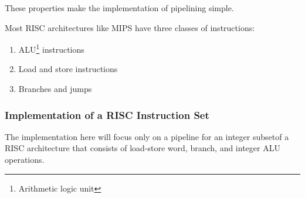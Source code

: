 \documentclass[12pt, a4paper]{article}
\theoremstyle{margin}
\begin{document}
      These properties make the implementation of pipelining simple.

      Most RISC architectures like MIPS have three classes of instructions:
      \begin{enumerate}
        \item ALU\footnote{Arithmetic logic unit} instructions 
        \item Load and store instructions
        \item Branches and jumps
      \end{enumerate}

    \subsubsection{Implementation of a RISC Instruction Set}

      \indent

      The implementation here will focus only on a pipeline for an integer subsetof a RISC architecture that consists of load-store word, branch, and integer ALU operations.
\end{document}
